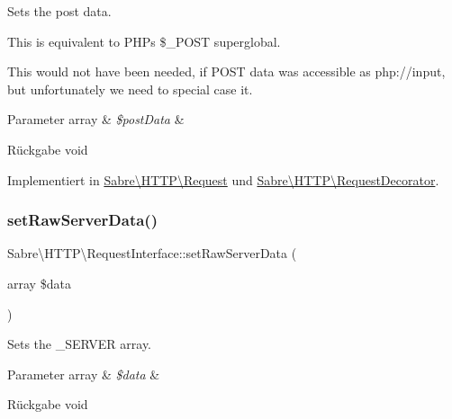 Sets the post data.

This is equivalent to P\+HP\textquotesingle{}s \$\+\_\+\+P\+O\+ST superglobal.

This would not have been needed, if P\+O\+ST data was accessible as php\+://input, but unfortunately we need to special case it.


\begin{DoxyParams}[1]{Parameter}
array & {\em \$post\+Data} & \\
\hline
\end{DoxyParams}
\begin{DoxyReturn}{Rückgabe}
void 
\end{DoxyReturn}


Implementiert in \mbox{\hyperlink{class_sabre_1_1_h_t_t_p_1_1_request_acb40e160bafcfe2d3899febda483db38}{Sabre\textbackslash{}\+H\+T\+T\+P\textbackslash{}\+Request}} und \mbox{\hyperlink{class_sabre_1_1_h_t_t_p_1_1_request_decorator_ac355c936a5f6baddd65c55f8d5d81032}{Sabre\textbackslash{}\+H\+T\+T\+P\textbackslash{}\+Request\+Decorator}}.

\mbox{\label{interface_sabre_1_1_h_t_t_p_1_1_request_interface_a025c72064e34e843a8fd402e6407894c}} 
\subsubsection{\texorpdfstring{set\+Raw\+Server\+Data()}{setRawServerData()}}
{\footnotesize\ttfamily Sabre\textbackslash{}\+H\+T\+T\+P\textbackslash{}\+Request\+Interface\+::set\+Raw\+Server\+Data (\begin{DoxyParamCaption}\item[{array}]{\$data }\end{DoxyParamCaption})}

Sets the \+\_\+\+S\+E\+R\+V\+ER array.


\begin{DoxyParams}[1]{Parameter}
array & {\em \$data} & \\
\hline
\end{DoxyParams}
\begin{DoxyReturn}{Rückgabe}
void 
\end{DoxyReturn}


